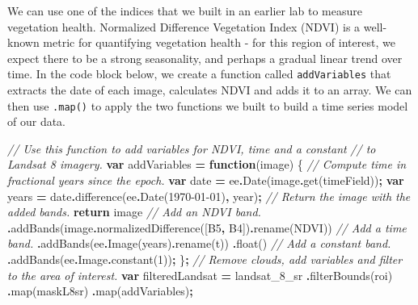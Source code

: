 \documentclass[
]{article}
\newenvironment{Shaded}{\begin{snugshade}}{\end{snugshade}}
\newcommand{\AttributeTok}[1]{\textcolor[rgb]{0.77,0.63,0.00}{#1}}
\newcommand{\CommentTok}[1]{\textcolor[rgb]{0.56,0.35,0.01}{\textit{#1}}}
\newcommand{\ControlFlowTok}[1]{\textcolor[rgb]{0.13,0.29,0.53}{\textbf{#1}}}
\newcommand{\DecValTok}[1]{\textcolor[rgb]{0.00,0.00,0.81}{#1}}
\newcommand{\FunctionTok}[1]{\textcolor[rgb]{0.00,0.00,0.00}{#1}}
\newcommand{\KeywordTok}[1]{\textcolor[rgb]{0.13,0.29,0.53}{\textbf{#1}}}
\newcommand{\NormalTok}[1]{#1}
\newcommand{\OperatorTok}[1]{\textcolor[rgb]{0.81,0.36,0.00}{\textbf{#1}}}
\newcommand{\StringTok}[1]{\textcolor[rgb]{0.31,0.60,0.02}{#1}}
\begin{document}
We can use one of the indices that we built in an earlier lab to measure vegetation health. Normalized Difference Vegetation Index (NDVI) is a well-known metric for quantifying vegetation health - for this region of interest, we expect there to be a strong seasonality, and perhaps a gradual linear trend over time. In the code block below, we create a function called \texttt{addVariables} that extracts the date of each image, calculates NDVI and adds it to an array. We can then use \texttt{.map()} to apply the two functions we built to build a time series model of our data.

\begin{Shaded}
\begin{Highlighting}[]
\CommentTok{// Use this function to add variables for NDVI, time and a constant}
\CommentTok{// to Landsat 8 imagery.}
\KeywordTok{var}\NormalTok{ addVariables }\OperatorTok{=} \KeywordTok{function}\NormalTok{(image) \{}
  \CommentTok{// Compute time in fractional years since the epoch.}
  \KeywordTok{var}\NormalTok{ date }\OperatorTok{=}\NormalTok{ ee}\OperatorTok{.}\FunctionTok{Date}\NormalTok{(image}\OperatorTok{.}\FunctionTok{get}\NormalTok{(timeField))}\OperatorTok{;}
  \KeywordTok{var}\NormalTok{ years }\OperatorTok{=}\NormalTok{ date}\OperatorTok{.}\FunctionTok{difference}\NormalTok{(ee}\OperatorTok{.}\FunctionTok{Date}\NormalTok{(}\StringTok{\textquotesingle{}1970{-}01{-}01\textquotesingle{}}\NormalTok{)}\OperatorTok{,} \StringTok{\textquotesingle{}year\textquotesingle{}}\NormalTok{)}\OperatorTok{;}
  \CommentTok{// Return the image with the added bands.}
  \ControlFlowTok{return}\NormalTok{ image}
  \CommentTok{// Add an NDVI band.}
  \OperatorTok{.}\FunctionTok{addBands}\NormalTok{(image}\OperatorTok{.}\FunctionTok{normalizedDifference}\NormalTok{([}\StringTok{\textquotesingle{}B5\textquotesingle{}}\OperatorTok{,} \StringTok{\textquotesingle{}B4\textquotesingle{}}\NormalTok{])}\OperatorTok{.}\FunctionTok{rename}\NormalTok{(}\StringTok{\textquotesingle{}NDVI\textquotesingle{}}\NormalTok{))}
  \CommentTok{// Add a time band.}
  \OperatorTok{.}\FunctionTok{addBands}\NormalTok{(ee}\OperatorTok{.}\FunctionTok{Image}\NormalTok{(years)}\OperatorTok{.}\FunctionTok{rename}\NormalTok{(}\StringTok{\textquotesingle{}t\textquotesingle{}}\NormalTok{))}
  \OperatorTok{.}\FunctionTok{float}\NormalTok{()}
  \CommentTok{// Add a constant band.}
  \OperatorTok{.}\FunctionTok{addBands}\NormalTok{(ee}\OperatorTok{.}\AttributeTok{Image}\OperatorTok{.}\FunctionTok{constant}\NormalTok{(}\DecValTok{1}\NormalTok{))}\OperatorTok{;}
\NormalTok{\}}\OperatorTok{;}
\CommentTok{// Remove clouds, add variables and filter to the area of interest.}
\KeywordTok{var}\NormalTok{ filteredLandsat }\OperatorTok{=}\NormalTok{ landsat\_8\_sr}
\OperatorTok{.}\FunctionTok{filterBounds}\NormalTok{(roi)}
\OperatorTok{.}\FunctionTok{map}\NormalTok{(maskL8sr)}
\OperatorTok{.}\FunctionTok{map}\NormalTok{(addVariables)}\OperatorTok{;}
\end{Highlighting}
\end{Shaded}
\end{document}
